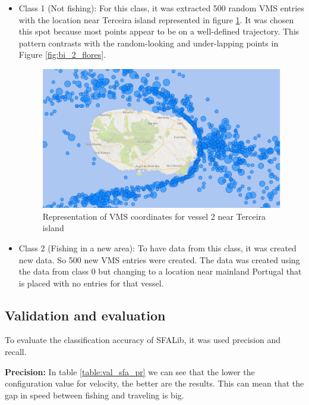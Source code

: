 \begin{itemize}
\item Class 1 (Not fishing): For this class, it was extracted 500 random VMS entries with the location near Terceira island represented in figure \ref{fig:bi_2_travel}. It was chosen this spot because most points appear to be on a well-defined trajectory. This pattern contrasts with the random-looking and under-lapping points in Figure \ref{fig:bi_2_flores}. 

\begin{figure}[]
\centering
\includegraphics[width=0.8\linewidth]{Chapters/img/2viagem.pdf}
\caption{Representation of VMS coordinates for vessel 2 near Terceira island}
\label{fig:bi_2_travel}
\end{figure}



\item Class 2 (Fishing in a new area): To have data from this class, it was created new data. So 500 new VMS entries were created. The data was created using the data from class 0 but changing to a location near mainland Portugal that is placed with no entries for that vessel. 

\end{itemize}




\subsection{Validation and evaluation}
\label{sec:val_SFA_val_eva}

To evaluate the classification accuracy of SFALib, it was used precision and recall.

\textbf{Precision:} %
In table \ref{table:val_sfa_pr} we can see that the lower the configuration value for velocity, the better are the results.
This can mean that the gap in speed between fishing and traveling is big.

